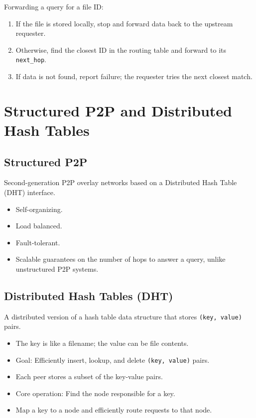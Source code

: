 \documentclass{article}
\begin{document}
Forwarding a query for a file ID:
\begin{enumerate}
    \item If the file is stored locally, stop and forward data back to the upstream requester.
    \item Otherwise, find the closest ID in the routing table and forward to its \texttt{next\_hop}.
    \item If data is not found, report failure; the requester tries the next closest match.
\end{enumerate}

\section{Structured P2P and Distributed Hash Tables}

\subsection{Structured P2P}

Second-generation P2P overlay networks based on a Distributed Hash Table (DHT) interface.

\begin{itemize}
    \item Self-organizing.
    \item Load balanced.
    \item Fault-tolerant.
    \item Scalable guarantees on the number of hops to answer a query, unlike unstructured P2P systems.
\end{itemize}

\subsection{Distributed Hash Tables (DHT)}

A distributed version of a hash table data structure that stores \texttt{(key, value)} pairs.

\begin{itemize}
    \item The key is like a filename; the value can be file contents.
    \item Goal: Efficiently insert, lookup, and delete \texttt{(key, value)} pairs.
    \item Each peer stores a subset of the key-value pairs.
    \item Core operation: Find the node responsible for a key.
    \item Map a key to a node and efficiently route requests to that node.
\end{itemize}
\end{document}
